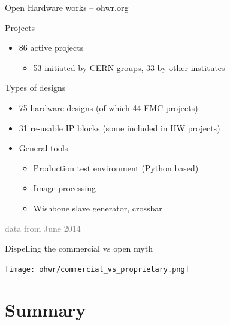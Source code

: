 \documentclass[compress,red]{beamer}
\begin{document}
\begin{frame}{Open Hardware works -- ohwr.org}
	\begin{block}{Projects}
   \begin{itemize}
	\item 86 active projects
	\begin{itemize}
		\item 53 initiated by CERN groups, 33 by other institutes
	   \end{itemize}
   \end{itemize}
	\end{block}

\begin{block}{Types of designs}
\begin{itemize}
	\item 75 hardware designs (of which 44 FMC projects)
	\item 31 re-usable IP blocks (some included in HW projects)
	\item General tools
	\begin{itemize}
		\item Production test environment (Python based)
		\item Image processing
		\item Wishbone slave generator, crossbar
	\end{itemize}
   \end{itemize}
	\end{block}
\textcolor{gray}{data from June 2014}
\end{frame}




\begin{frame}{Dispelling the commercial vs open myth}
 \begin{center}
   \texttt{[image: ohwr/commercial\_vs\_proprietary.png]}
 \end{center} 
\end{frame}



\section{Summary}
\end{document}
